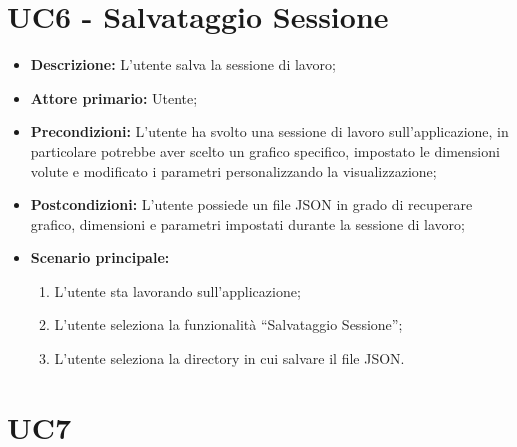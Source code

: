 \section{UC6 - Salvataggio Sessione}

\begin{itemize}
  \item \textbf{Descrizione:} L'utente salva la sessione di lavoro;
  \item \textbf{Attore primario:} Utente;
  \item \textbf{Precondizioni:} L'utente ha svolto una sessione di lavoro sull'applicazione, in particolare potrebbe aver scelto un grafico specifico, impostato le dimensioni volute e modificato i parametri personalizzando la visualizzazione;
  \item \textbf{Postcondizioni:} L'utente possiede un file JSON in grado di recuperare grafico, dimensioni e parametri impostati durante la sessione di lavoro;
  \item \textbf{Scenario principale:}
  \begin{enumerate}
    \item L'utente sta lavorando sull'applicazione;
    \item L'utente seleziona la funzionalità ``Salvataggio Sessione'';
    \item L'utente seleziona la directory in cui salvare il file JSON.
  \end{enumerate}
\end{itemize}

\section{UC7}
